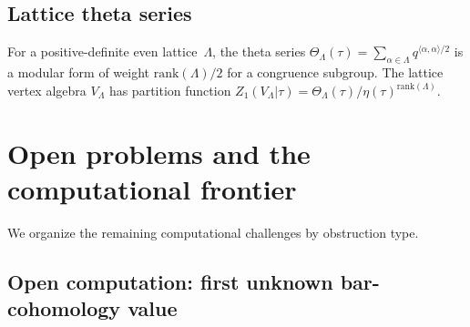 \subsection{Lattice theta series}

For a positive-definite even lattice~$\Lambda$, the theta series $\Theta_\Lambda(\tau) = \sum_{\alpha \in \Lambda} q^{\langle\alpha,\alpha\rangle/2}$ is a modular form of weight $\mathrm{rank}(\Lambda)/2$ for a congruence subgroup. The lattice vertex algebra $V_\Lambda$ has partition function $Z_1(V_\Lambda | \tau) = \Theta_\Lambda(\tau) / \eta(\tau)^{\mathrm{rank}(\Lambda)}$.


\section{Open problems and the computational frontier}
\label{sec:open-problems}

We organize the remaining computational challenges by obstruction type.

\subsection{Open computation: first unknown bar-cohomology value}

